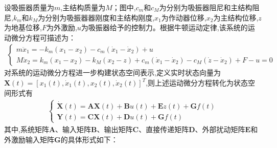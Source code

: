 \documentclass{scrbook}
\begin{document}
{{\par}设吸振器质量为$m$,主结构质量为$M$；图中,$c_{m}$和$c_{M}$为分别为吸振器阻尼和主结构阻尼,$k_{m}$和$k_{M}$为分别为吸振器器刚度和主结构刚度,$x_{1}$为作动器位移,$x_{2}$为主结构位移,$z$为地基位移,$F$为外激励,$u$为吸振器给予的控制力。根据牛顿运动定律,该系统的运动微分方程可描述为：
\begin{align}
\tag{3-1}
\begin{cases} m\ddot{x}_{1}=-k_{m}\left(x_{1}-x_{2}\right)-c_{m}\left(\dot{x}_{1}-\dot{x}_{2}\right)+u\\
M\ddot{x}_{2}=k_{m}\left(x_{1}-x_{2}\right)-k_{M}\left(x_{2}-z\right)+c_{m}\left(\dot{x}_{1}-\dot{x}_{2}\right)-c_{M}\left(\dot{z}-\dot{x}_{2}\right)+F-u=0
\end{cases} 
\end{align}
对系统的运动微分方程进一步构建状态空间表示,定义实时状态向量为$\mathbf{X}(t)=[x_{1}(t),\dot{x}_{1}(t),x_{2}(t),\dot{x}_{2}(t)]^{T}$,则上述运动微分方程转化为状态空间形式有
\begin{align}
\tag{3-2}
\begin{cases} \dot{\mathbf{X}}\left(t\right)=\mathbf{AX}\left(t\right)+\mathbf{B}u\left(t\right)+\mathbf{E}z\left(t\right)+\mathbf{G}f\left(t\right)\\
\mathbf{Y}(t)=\mathbf{CX}(t)+\mathbf{D}u(t)+\mathbf{G}f(t)
\end{cases} 
\end{align}
其中,系统矩阵$\mathbf{A}$、输入矩阵$\mathbf{B}$、输出矩阵$\mathbf{C}$、直接传递矩阵$\mathbf{D}$、外部扰动矩阵$\mathbf{E}$和外激励输入矩阵$\mathbf{G}$的具体形式如下：

}
\end{document}
